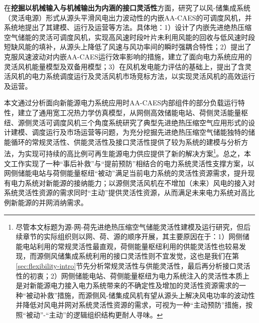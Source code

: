在\textbf{挖掘以机械输入与机械输出为内涵的接口灵活性}方面，研究了以风-储集成系统（灵活电源）形式从源头平滑风电出力波动性的内嵌AA-CAES的可调度风机，并系统地提出了其建模、运行及运营等方法。具体地：1）设计了内嵌先进绝热压缩空气储能的灵活可调度风机，实现高风速时段叶片未利用风能的回收与低风速时段短缺风能的填补，从源头上降低了风速与风功率间的瞬时强耦合特性；2）提出了克服风速波动对内嵌AA-CAES运行效率影响的措施，建立了面向电力系统应用的灵活风机能量模型及双备用模型；3）在风机发电能力评估的基础上，提出了含灵活风机的电力系统调度运行及灵活风机市场竞标方法，以实现灵活风机的高效运行及运营。

本文通过分析面向新能源电力系统应用时AA-CAES内部组件的部分负载运行特性，建立了通用宽工况热力学仿真模型，从网侧高效储能电站、荷侧灵活能量枢纽、源侧灵活可调度风机三个角度系统研究了典型先进绝热压缩空气应用形式的设计建模、调度运行及市场运营等问题，为充分挖掘先进绝热压缩空气储能独特的储能循环的常规灵活性、供能灵活性及接口灵活性提供了较为系统的建模与分析方法，为实现可持续的高比例可再生能源电力供应提供了新的解决方案\footnote{尽管本文标题为源-网-荷先进绝热压缩空气储能灵活性建模及运行研究，但后续章节的实际组织则以网、荷、源的顺序开展，其主要原因在于：1）网侧储能电站利用的常规灵活性最直观，荷侧能量枢纽利用的供能灵活性也较易发现，而源侧风储集成系统利用的接口灵活性则不宜发觉，这也是我们在第\ref{sec:flexibility-intro}节先分析常规灵活性与供能灵活性，最后再分析接口灵活性的初衷；2）网侧储能电站、荷侧能量枢纽为电力系统注入的灵活性本质上是对新能源电力接入电力系统带来的不确定性及增加的灵活性资源需求的一种“被动补救”措施，而源侧风-储集成风机有望从源头上解决风电功率的波动性并降低对风电并网对系统灵活性资源的需求，可视为一种“主动预防”措施，按照“被动”-“主动”的逻辑组织结构更耐人寻味。}。总之，本文工作实现了一种“事后补救”与“提前预防”相结合的电力系统灵活性支撑方案，以网侧储能电站与荷侧能量枢纽“被动”满足当前电力系统的灵活性资源需求，提升现有电力系统对新能源的接纳能力；以源侧灵活风机在不增加（未来）风电的接入对系统灵活性资源的需求同时“主动”提供灵活性资源，从而满足未来电力系统对高比例新能源的并网消纳需求。

